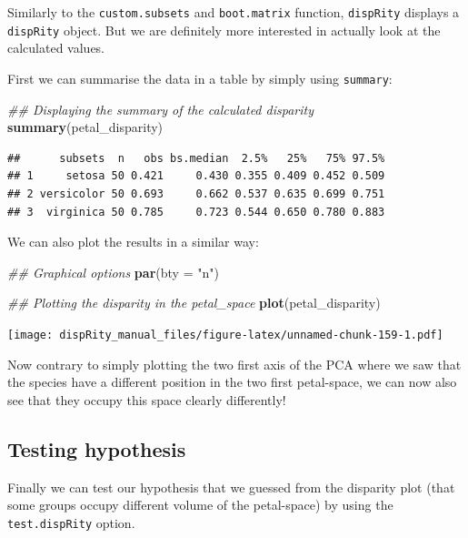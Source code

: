 \documentclass[]{book}
\newenvironment{Shaded}{\begin{snugshade}}{\end{snugshade}}
\newcommand{\CommentTok}[1]{\textcolor[rgb]{0.56,0.35,0.01}{\textit{#1}}}
\newcommand{\DataTypeTok}[1]{\textcolor[rgb]{0.13,0.29,0.53}{#1}}
\newcommand{\KeywordTok}[1]{\textcolor[rgb]{0.13,0.29,0.53}{\textbf{#1}}}
\newcommand{\NormalTok}[1]{#1}
\newcommand{\StringTok}[1]{\textcolor[rgb]{0.31,0.60,0.02}{#1}}
\begin{document}
Similarly to the \texttt{custom.subsets} and \texttt{boot.matrix} function, \texttt{dispRity} displays a \texttt{dispRity} object.
But we are definitely more interested in actually look at the calculated values.

First we can summarise the data in a table by simply using \texttt{summary}:

\begin{Shaded}
\begin{Highlighting}[]
\CommentTok{## Displaying the summary of the calculated disparity}
\KeywordTok{summary}\NormalTok{(petal_disparity)}
\end{Highlighting}
\end{Shaded}

\begin{verbatim}
##      subsets  n   obs bs.median  2.5%   25%   75% 97.5%
## 1     setosa 50 0.421     0.430 0.355 0.409 0.452 0.509
## 2 versicolor 50 0.693     0.662 0.537 0.635 0.699 0.751
## 3  virginica 50 0.785     0.723 0.544 0.650 0.780 0.883
\end{verbatim}

We can also plot the results in a similar way:

\begin{Shaded}
\begin{Highlighting}[]
\CommentTok{## Graphical options}
\KeywordTok{par}\NormalTok{(}\DataTypeTok{bty =} \StringTok{"n"}\NormalTok{)}

\CommentTok{## Plotting the disparity in the petal_space}
\KeywordTok{plot}\NormalTok{(petal_disparity)}
\end{Highlighting}
\end{Shaded}

\texttt{[image: dispRity\_manual\_files/figure-latex/unnamed-chunk-159-1.pdf]}

Now contrary to simply plotting the two first axis of the PCA where we saw that the species have a different position in the two first petal-space, we can now also see that they occupy this space clearly differently!

\hypertarget{testing-hypothesis}{%
\subsection{Testing hypothesis}\label{testing-hypothesis}}

Finally we can test our hypothesis that we guessed from the disparity plot (that some groups occupy different volume of the petal-space) by using the \texttt{test.dispRity} option.
\end{document}
